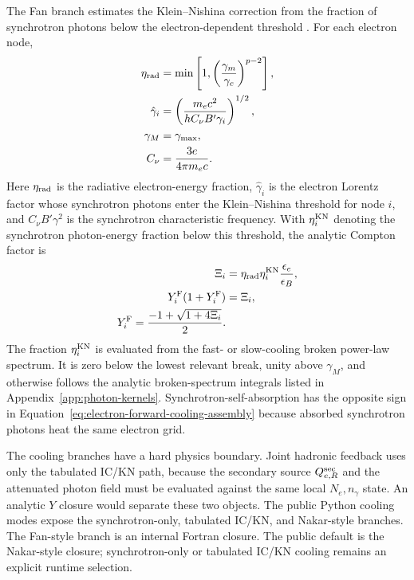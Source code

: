\documentclass[twocolumn]{aastex702}
\begin{document}
The Fan branch estimates the Klein--Nishina correction from the fraction of
synchrotron photons below the electron-dependent threshold
\citep{FanPiran2008}.  For each electron node,
\begin{equation}
\begin{aligned}
\eta_{\rm rad}&=\min\left[1,\left(\frac{\gamma_m}{\gamma_c}\right)^{p-2}\right],\\
\hat\gamma_i&=
\left(\frac{m_e c^2}{hC_\nu B'\gamma_i}\right)^{1/2},\\
\gamma_M&=\gamma_{\max},\\
C_\nu&=\frac{3e}{4\pi m_e c}.
\end{aligned}
\label{eq:synch-frequency-coeff}
\end{equation}
Here \(\eta_{\rm rad}\) is the radiative electron-energy fraction,
\(\hat\gamma_i\) is the electron Lorentz factor whose synchrotron photons enter
the Klein--Nishina threshold for node \(i\), and \(C_\nu B'\gamma^2\) is the
synchrotron characteristic frequency.  With
\(\eta_i^{\rm KN}\) denoting the synchrotron photon-energy fraction below this
threshold, the analytic Compton factor is
\begin{equation}
\begin{aligned}
\Xi_i&=\eta_{\rm rad}\eta_i^{\rm KN}\frac{\epsilon_e}{\epsilon_B},\\
Y_i^{\rm F}(1+Y_i^{\rm F})&=\Xi_i,\\
Y_i^{\rm F}=
\frac{-1+\sqrt{1+4\Xi_i}}{2}.
\end{aligned}
\end{equation}
The fraction \(\eta_i^{\rm KN}\) is evaluated from the fast- or slow-cooling
broken power-law spectrum.  It is zero below the lowest relevant break, unity
above \(\gamma_M\), and otherwise follows the analytic broken-spectrum integrals
listed in Appendix~\ref{app:photon-kernels}.  Synchrotron-self-absorption has the
opposite sign in Equation~\eqref{eq:electron-forward-cooling-assembly} because
absorbed synchrotron photons heat the same electron grid.

The cooling branches have a hard physics boundary.  Joint hadronic feedback uses
only the tabulated IC/KN path, because the secondary source
\(Q_{e,R}^{\rm sec}\) and the attenuated photon field must be evaluated against
the same local \(N_e,n_\gamma\) state.  An analytic \(Y\) closure would separate
these two objects.  The public Python cooling modes expose the synchrotron-only,
tabulated IC/KN, and Nakar-style branches.  The Fan-style branch is an internal
Fortran closure.  The public default is the Nakar-style closure; synchrotron-only
or tabulated IC/KN cooling remains an explicit runtime selection.
\end{document}

